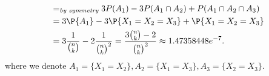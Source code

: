 \begin{exercise}
\begin{solution}
\begin{enumerate}
\begin{enumerate}
\begin{align*}
				& =_{\textit{by symmetry}} 3 P(A_1) - 3 P(A_1 \cap A_2) + P(A_1\cap A_2\cap A_3)\\
				& =   3 \P{A_1} - 3 \P{X_1=X_2=X_3} + \P{X_1=X_2=X_3}\\
				& =  3 \frac{1}{{n \choose k} }   - 2  \frac{1}{{n \choose k}^2 }=    \frac{3{n \choose k}-2}{{n \choose k}^2 } \approx 1.47358448e^{-7}.
			\end{align*}
			where we denote $A_1=\{X_1=X_2\}, A_2=\{X_1=X_3\}, A_3=\{X_2=X_3\}$. 
		\end{enumerate}
		\end{enumerate}
	\end{solution}	
\end{exercise}








